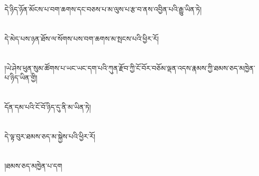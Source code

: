 དེ་ཉིད་ཉོན་མོངས་པ་བག་ཆགས་དང་བཅས་པ་མ་ལུས་པ་རྩ་བ་ནས་འབྱིན་པའི་རྒྱུ་ཡིན་ཏེ།\chapter{ }དེ་མེད་པས་ཉན་ཐོས་ལ་སོགས་པས་བག་ཆགས་མ་སྤངས་པའི་ཕྱིར་རོ།\chapter{ }།ཡེ་ཤེས་ཕུན་སུམ་ཚོགས་པ་ཡང་ཡང་དག་པའི་ཀུན་རྫོབ་ཀྱི་ངོ་བོར་བཅོམ་ལྡན་འདས་རྣམས་ཀྱི་ཐམས་ཅད་མཁྱེན་པ་ཉིད་ཡིན་གྱི།\chapter{ }དོན་དམ་པའི་ངོ་བོ་ཉིད་དུ་ནི་མ་ཡིན་ཏེ།\chapter{ }དེ་ལྟ་བུར་ཐམས་ཅད་མ་སྐྱེས་པའི་ཕྱིར་རོ།\chapter{ }།ཐམས་ཅད་མཁྱེན་པ་དག